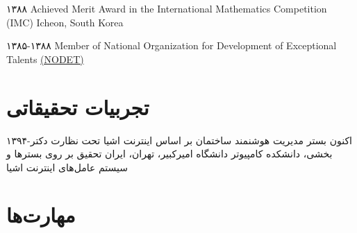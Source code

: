 \documentclass[]{friggeri-cv-fa} %
\begin{document}
\begin{entrylist}

\entry
{۱۳۸۸}
{{\normalfont Achieved} \textcolor{Ocean}{Merit Award} {\normalfont in the International Mathematics Competition (IMC) Icheon, South Korea}}
{}
{}


\entry
{۱۳۸۵-۱۳۸۸}
{\normalfont Member of National Organization for Development of Exceptional Talents \href{https://en.wikipedia.org/wiki/National_Organization_for_Development_of_Exceptional_Talents}{(NODET)}}
{}
{}


\end{entrylist}


\section{تجربیات تحقیقاتی}

\begin{entrylist}

\entry
{۱۳۹۴-اکنون}
{بستر مدیریت هوشنمند ساختمان بر اساس اینترنت اشیا}
{تحت نظارت دکتر بخشی، دانشکده کامپیوتر دانشگاه امیرکبیر، تهران، ایران}
{تحقیق بر روی بسترها و سیستم عامل‌های اینترنت اشیا}

\end{entrylist}


\section{مهارت‌ها}
\end{document}
